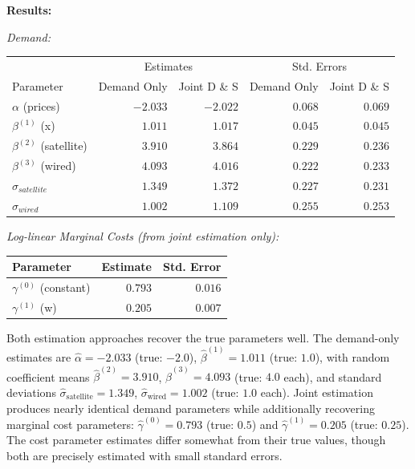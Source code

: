\documentclass[english,11pt]{article}
\begin{document}
\begin{enumerate}
\textbf{Results:}

\textit{Demand:}

\begin{center}
\begin{tabular}{lrrrr}
\hline
 & \multicolumn{2}{c}{Estimates} & \multicolumn{2}{c}{Std. Errors} \\
Parameter & Demand Only & Joint D \& S & Demand Only & Joint D \& S \\
\hline
$\alpha$ (prices) & $-2.033$ & $-2.022$ & $0.068$ & $0.069$ \\
$\beta^{(1)}$ (x) & $1.011$ & $1.017$ & $0.045$ & $0.045$ \\
$\beta^{(2)}$ (satellite) & $3.910$ & $3.864$ & $0.229$ & $0.236$ \\
$\beta^{(3)}$ (wired) & $4.093$ & $4.016$ & $0.222$ & $0.233$ \\
\hline
$\sigma_{satellite}$ & $1.349$ & $1.372$ & $0.227$ & $0.231$ \\
$\sigma_{wired}$ & $1.002$ & $1.109$ & $0.255$ & $0.253$ \\
\hline
\end{tabular}
\end{center}

\textit{Log-linear Marginal Costs (from joint estimation only):}

\begin{center}
\begin{tabular}{lrr}
\hline
Parameter & Estimate & Std. Error \\
\hline
$\gamma^{(0)}$ (constant) & $0.793$ & $0.016$ \\
$\gamma^{(1)}$ (w) & $0.205$ & $0.007$ \\
\hline
\end{tabular}
\end{center}

Both estimation approaches recover the true parameters well. The demand-only estimates are $\hat{\alpha} = -2.033$ (true: $-2.0$), $\hat{\beta}^{(1)} = 1.011$ (true: $1.0$), with random coefficient means $\hat{\beta}^{(2)} = 3.910$, $\hat{\beta}^{(3)} = 4.093$ (true: $4.0$ each), and standard deviations $\hat{\sigma}_{\text{satellite}} = 1.349$, $\hat{\sigma}_{\text{wired}} = 1.002$ (true: $1.0$ each). Joint estimation produces nearly identical demand parameters while additionally recovering marginal cost parameters: $\hat{\gamma}^{(0)} = 0.793$ (true: $0.5$) and $\hat{\gamma}^{(1)} = 0.205$ (true: $0.25$). The cost parameter estimates differ somewhat from their true values, though both are precisely estimated with small standard errors.


\end{enumerate}
\end{document}
